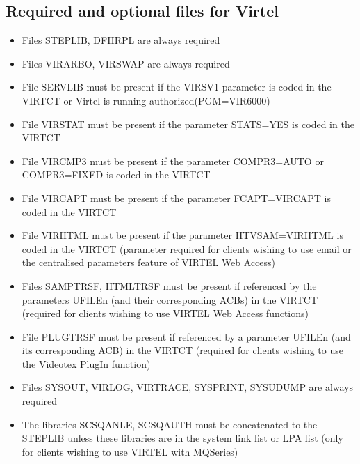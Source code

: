 \documentclass[letterpaper,10pt,english]{sphinxmanual}
\begin{document}
\subsection{Required and optional files for Virtel}
\label{\detokenize{Installation_Guide:required-and-optional-files-for-virtel}}\begin{itemize}
\item {} 
\sphinxAtStartPar
Files STEPLIB, DFHRPL are always required

\item {} 
\sphinxAtStartPar
Files VIRARBO, VIRSWAP are always required

\item {} 
\sphinxAtStartPar
File SERVLIB must be present if the VIRSV1 parameter is coded in the VIRTCT or Virtel is running authorized(PGM=VIR6000)

\item {} 
\sphinxAtStartPar
File VIRSTAT must be present if the parameter STATS=YES is coded in the VIRTCT

\item {} 
\sphinxAtStartPar
File VIRCMP3 must be present if the parameter COMPR3=AUTO or COMPR3=FIXED is coded in the VIRTCT

\item {} 
\sphinxAtStartPar
File VIRCAPT must be present if the parameter FCAPT=VIRCAPT is coded in the VIRTCT

\item {} 
\sphinxAtStartPar
File VIRHTML must be present if the parameter HTVSAM=VIRHTML is coded in the VIRTCT (parameter required for clients wishing to use e\sphinxhyphen{}mail or the centralised parameters feature of VIRTEL Web Access)

\item {} 
\sphinxAtStartPar
Files SAMPTRSF, HTMLTRSF must be present if referenced by the parameters UFILEn (and their corresponding ACBs) in the VIRTCT (required for clients wishing to use VIRTEL Web Access functions)

\item {} 
\sphinxAtStartPar
File PLUGTRSF must be present if referenced by a parameter UFILEn (and its corresponding ACB) in the VIRTCT (required for clients wishing to use the Videotex Plug\sphinxhyphen{}In function)

\item {} 
\sphinxAtStartPar
Files SYSOUT, VIRLOG, VIRTRACE, SYSPRINT, SYSUDUMP are always required

\item {} 
\sphinxAtStartPar
The libraries SCSQANLE, SCSQAUTH must be concatenated to the STEPLIB unless these libraries are in the system link list or LPA list (only for clients wishing to use VIRTEL with MQSeries)


\end{itemize}
\end{document}
